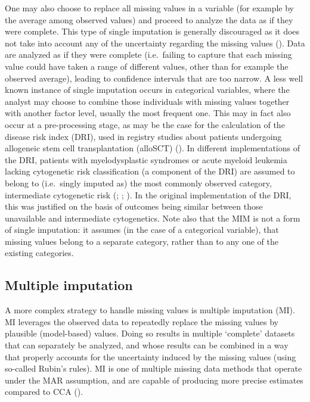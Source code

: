 \documentclass[
  letterpaper,
  paper=240mm:170mm,
  twoside=true,
  open=right,
  fontsize=10pt,
  pagesize=false,
  BCOR=15mm,
  DIV=14,
  headinclude=true,
  footinclude=false,
  headsepline=on]{scrbook}
\begin{document}
One may also choose to replace all missing values in a variable (for
example by the average among observed values) and proceed to analyze the
data as if they were complete. This type of single imputation is
generally discouraged as it does not take into account any of the
uncertainty regarding the missing values
(). Data are analyzed as if they were complete (i.e.~failing
to capture that each missing value could have taken a range of different
values, other than for example the observed average), leading to
confidence intervals that are too narrow. A less well known instance of
single imputation occurs in categorical variables, where the analyst may
choose to combine those individuals with missing values together with
another factor level, usually the most frequent one. This may in fact
also occur at a pre-processing stage, as may be the case for the
calculation of the disease risk index (DRI), used in registry studies
about patients undergoing allogeneic stem cell transplantation (alloSCT)
(). In different implementations of the DRI, patients with
myelodysplastic syndromes or acute myeloid leukemia lacking cytogenetic
risk classification (a component of the DRI) are assumed to belong to
(i.e.~singly imputed as) the most commonly observed category,
intermediate cytogenetic risk
(;
;
). In the original implementation of the DRI, this was
justified on the basis of outcomes being similar between those
unavailable and intermediate cytogenetics. Note also that the MIM is not
a form of single imputation: it assumes (in the case of a categorical
variable), that missing values belong to a separate category, rather
than to any one of the existing categories.

\subsection{Multiple imputation}\label{multiple-imputation-1}

A more complex strategy to handle missing values is multiple imputation
(MI). MI leverages the observed data to repeatedly replace the missing
values by plausible (model-based) values. Doing so results in multiple
`complete' datasets that can separately be analyzed, and whose results
can be combined in a way that properly accounts for the uncertainty
induced by the missing values (using so-called Rubin's rules). MI is one
of multiple missing data methods that operate under the MAR assumption,
and are capable of producing more precise estimates compared to CCA
().
\end{document}
